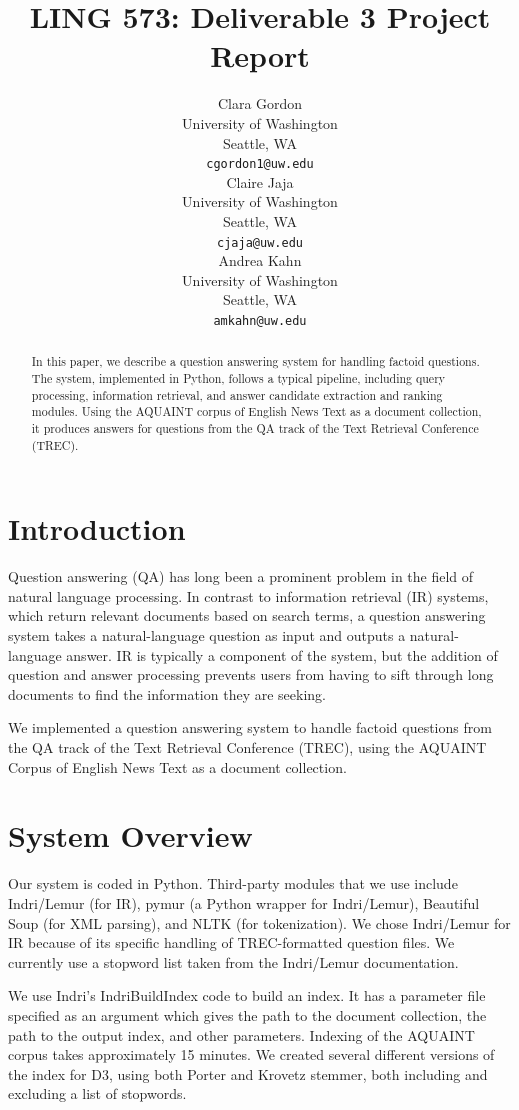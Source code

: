 \documentclass[11pt]{article}
\title{LING 573: Deliverable 3 Project Report}
\author{Clara Gordon \\
  University of Washington \\
  Seattle, WA \\
  {\tt cgordon1@uw.edu} \\\And
  Claire Jaja \\
  University of Washington \\
  Seattle, WA \\
  {\tt cjaja@uw.edu} \\\And
  Andrea Kahn \\
  University of Washington \\
  Seattle, WA \\
  {\tt amkahn@uw.edu} \\}
\date{}
\begin{document}
\maketitle
\begin{abstract}

In this paper, we describe a question answering system for handling factoid questions.  The system, implemented in Python, follows a typical pipeline, including query processing, information retrieval, and answer candidate extraction and ranking modules. Using the AQUAINT corpus of English News Text as a document collection, it produces answers for questions from the QA track of the Text Retrieval Conference (TREC).

\end{abstract}

\section{Introduction}

Question answering (QA) has long been a prominent problem in the field of natural language processing. In contrast to information retrieval (IR) systems, which return relevant documents based on search terms, a question answering system takes a natural-language question as input and outputs a natural-language answer. IR is typically a component of the system, but the addition of question and answer processing prevents users from having to sift through long documents to find the information they are seeking.

We implemented a question answering system to handle factoid questions from the QA track of the Text Retrieval Conference (TREC), using the AQUAINT Corpus of English News Text as a document collection.

\section{System Overview}

Our system is coded in Python. Third-party modules that we use include Indri/Lemur (for IR), pymur (a Python wrapper for Indri/Lemur), Beautiful Soup (for XML parsing), and NLTK (for tokenization). We chose Indri/Lemur for IR because of its specific handling of TREC-formatted question files. We currently use a stopword list taken from the Indri/Lemur documentation.

We use Indri's IndriBuildIndex code to build an index.  It has a parameter file specified as an argument which gives the path to the document collection, the path to the output index, and other parameters.  Indexing of the AQUAINT corpus takes approximately 15 minutes.  We created several different versions of the index for D3, using both Porter and Krovetz stemmer, both including and excluding a list of stopwords.
\end{document}
